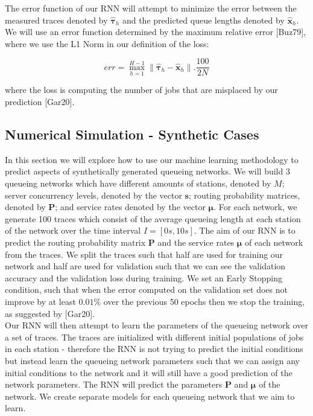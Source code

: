 \documentclass[a4paper,11pt,titlepage]{article}
\begin{document}
The error function of our RNN will attempt to minimize the error between the measured traces denoted by $\hat{\bm{\tau}}_h$ and the predicted queue lengths denoted by $\hat{\mathbf{x}}_h$. We will use an error function determined by the maximum relative error [Buz79], where we use the L1 Norm in our definition of the loss:

\begin{equation}
    err = \max_{h=1}^{H-1} \lVert \hat{\bm{\tau}}_h - \hat{\mathbf{x}}_h\rVert . \frac{100}{2N}
    \label{eqn:loss_function}
\end{equation}

where the loss is computing the number of jobs that are misplaced by our prediction [Gar20]. 

\subsection{Numerical Simulation - Synthetic Cases}

In this section we will explore how to use our machine learning methodology to predict aspects of synthetically generated queueing networks. We will build 3 queueing networks which have different amounts of stations, denoted by $M$; server concurrency levels, denoted by the vector $\mathbf{s}$; routing probability matrices, denoted by $\mathbf{P}$; and service rates denoted by the vector $\bm{\mu}$. For each network, we generate 100 traces which consist of the average queueing length at each station of the network over the time interval $ I = [0s,10s]$. The aim of our RNN is to predict the routing probability matrix $\mathbf{P}$ and the service rates $\bm{\mu}$ of each network from the traces. We split the traces such that half are used for training our network and half are used for validation such that we can see the validation accuracy and the validation loss during training. We set an Early Stopping condition, such that when the error computed on the validation set does not improve by at least $0.01$\% over the previous 50 epochs then we stop the training, as suggested by [Gar20]. \\ 

Our RNN will then attempt to learn the parameters of the queueing network over a set of traces. The traces are initialized with different initial populations of jobs in each station - therefore the RNN is not trying to predict the initial conditions but instead learn the queueing network parameters such that we can assign any initial conditions to the network and it will still have a good prediction of the network parameters. The RNN will predict the parameters $\mathbf{P}$ and $\bm{\mu}$ of the network. We create separate models for each queueing network that we aim to learn. 
\end{document}
